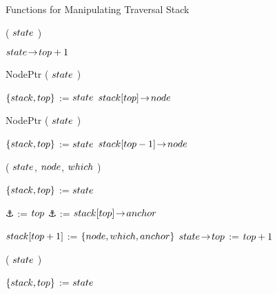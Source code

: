 \begin{limitscope}


\begin{algorithm}[tb]
\caption{Functions for Manipulating Traversal Stack} 
\label{algo:local-stack|functions}
\DefineKeyWords
\DontPrintSemicolon
\Integer \Size( $state$ )\;
\PrintSemicolon
\label{lin:local-stack|begin}
\label{lin:local-size:begin}
\Begin
{
   
   \Return $state \!\rightarrow\! top + 1$\;
	 \label{lin:local-size:end}
}
\BlankLine
\DontPrintSemicolon
NodePtr \GetTop( $state$ )\;
\PrintSemicolon
\label{lin:local-get|top:begin}
\Begin
{
   
   $\{  stack, top  \}$ := $state$\;
	 \label{lin:local-stack|retrieve}
	 \Return $stack[top] \!\rightarrow\! node$\;
	 \label{lin:local-get|top:end}
}
\BlankLine
\DontPrintSemicolon
NodePtr \GetSecondToTop( $state$ )\;
\label{lin:local-get|second|to|top:begin}
\PrintSemicolon
\Begin
{
   
   $\{  stack, top  \}$ := $state$\;
	 \Return $stack[top-1] \!\rightarrow\! node$\;
	 \label{lin:local-get|second|to|top:end}
}
\BlankLine
\DontPrintSemicolon
\AddToTop(  $state$, $node$, $\which$ )\;
\PrintSemicolon
\label{lin:local-add|to|top:begin}
\Begin
{
   
   $\{  stack, top  \}$ := $state$\;
   	
   \lIf{$\which$ = \RIGHT}
	 {
	    $\anchor$ := $top$
	 }
	 \lElse
	 {
	    $\anchor$ := $stack[top] \!\rightarrow\! anchor$
	 }
   
   $stack[top + 1]$ := $\{  node, which, anchor  \}$\;
	 $state \!\rightarrow\! top$ := $top + 1$\;
	 \OptReturn
	 \label{lin:local-add|to|top:end}
	
}
\BlankLine
\DontPrintSemicolon
\RemoveFromTop ( $state$ )\;
\PrintSemicolon
\label{lin:local-remove|from|top:begin}
\Begin
{
   
   $\{  stack, top  \}$ := $state$\;
	
}
\end{algorithm}
\end{limitscope}
